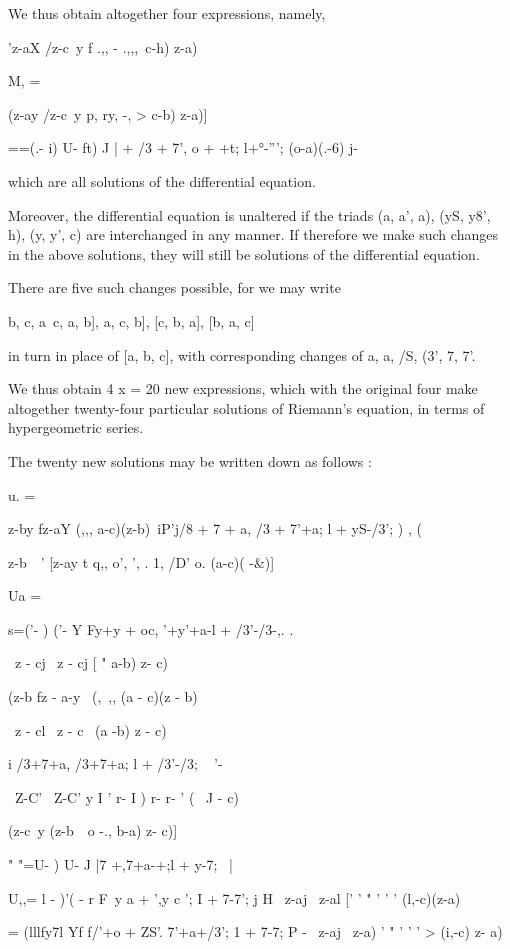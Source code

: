 %
%

We thus obtain altogether four expressions, namely,

'z-aX /z-c\ y f .,, - .,,,\ c-h) z-a)\

M, =

(z-ay /z-c\ y p, ry, -, > c-b) z-a)]

 ==(.- i) U- ft) J | + /3 + 7', o + +t; l+°-'''; (o-a)(.-6) j-

which are all solutions of the differential equation.

Moreover, the differential equation is unaltered if the triads (a, a',
a), (yS, y8', h), (y, y', c) are interchanged in any manner. If
therefore we make such changes in the above solutions, they will still
be solutions of the differential equation.

There are five such changes possible, for we may write

 b, c, a\, c, a, b], a, c, b], [c, b, a], [b, a, c]

in turn in place of [a, b, c], with corresponding changes of a, a, /S,
(3', 7, 7'.

We thus obtain 4 x = 20 new expressions, which with the original four
make altogether twenty-four particular solutions of Riemann's
equation, in terms of hypergeometric series.

The twenty new solutions may be written down as follows :

u. =

z-by fz-aY (,,, a-c)(z-b)\ iP'j/8 + 7 + a, /3 + 7'+a; l + yS-/3'; )
, (

z-b\ \ ' [z-ay t q,, o', ', . 1, /D' o. (a-c)( -\&)]

Ua =

 s=('- ) ('- Y Fy+y + oc, '+y'+a-l + /3'-/3-,. .

\ z - cj \ z - cj [ " a-b) z- c)

(z-b fz - a-y \ (, \,,, (a - c)(z - b)

\ z - cl \ z - c \ (a -b) z - c)

i /3+7+a, /3+7+a; l + /3'-/3; ~ '-\

\ Z-C' \ Z-C' y I ' r- I ) r- r- ' ( \ J - c)\

(z-c\ y (z-b\ \, o -., b-a) z- c)]

" "=U- ) U- J |7 +,7+a-+;l + y-7; \; \ |

U,,= l - )'( - r F\ y a + ',y c '; I + 7-7'; j H \ z-aj \ z-al [' ' "
' ' ' (l,-c)(z-a)\

   = (lllfy7l Yf f/'+o + ZS'. 7'+a+/3'; 1 + 7-7; P - \ z-aj \ z-a) ' "
' ' ' > (i,-c) z- a)

